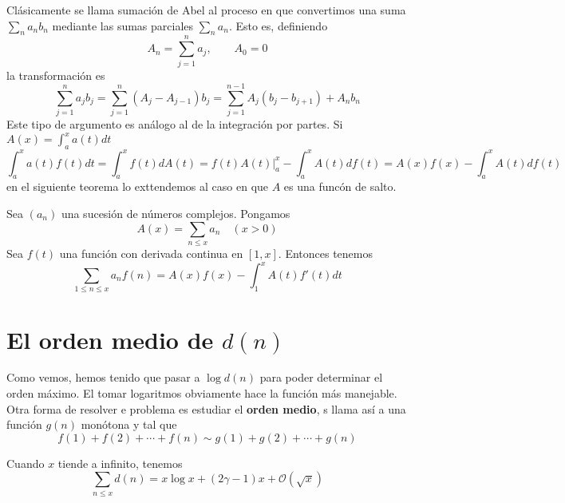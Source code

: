 \documentclass[TAN.tex]{subfiles}
\begin{document}
Clásicamente se llama sumación de Abel al proceso en que convertimos una suma $\sum_n a_n b_n$ mediante las sumas parciales $\sum_n a_n$. Esto es, definiendo
\[ A_n = \sum_{j=1}^n a_j, \qquad A_0 = 0 \]
la transformación es
\[ \sum_{j=1}^n a_j b_j = \sum_{j=1}^n (A_j-A_{j-1})b_j = \sum_{j=1}^{n-1} A_j(b_j-b_{j+1}) + A_n b_n \]
Este tipo de argumento es análogo al de la integración por partes. Si $A(x)=\int_a^x a(t)dt$
\[ \int_a^x a(t)f(t) dt = \int_a^x f(t) dA(t) = \left.f(t)A(t)\right|_a^x - \int_a^x A(t) df(t) = A(x)f(x) - \int_a^x A(t) df(t) \]
en el siguiente teorema lo exttendemos al caso en que $A$ es una funcón de salto.

\begin{teorema} Sea $(a_n)$ una sucesión de números complejos. Pongamos
\[ A(x) = \sum_{n≤x} a_n \quad (x > 0) \]
Sea $f(t)$ una función con derivada continua en $[1,x]$. Entonces tenemos
\[ \sum_{1≤n≤x} a_nf(n) = A(x)f(x)-\int_1^x A(t)f'(t)dt \]
\end{teorema}
\section{El orden medio de $d(n)$}
Como vemos, hemos tenido que pasar a $\log d(n)$ para poder determinar el orden máximo. El tomar logaritmos obviamente hace la función más manejable. Otra forma de resolver e problema es estudiar el \textbf{orden medio}, s llama así a una función $g(n)$ monótona y tal que
\[ f(1) + f(2) + \cdots + f(n) \sim g(1) + g(2) + \cdots + g(n) \]
\begin{teorema}[Dirichlet]
Cuando $x$ tiende a infinito, tenemos
\[ \sum_{n≤x} d(n) = x \log x + (2γ -1)x + \mathcal{O}(\sqrt{x}) \]
\end{teorema}
\end{document}

